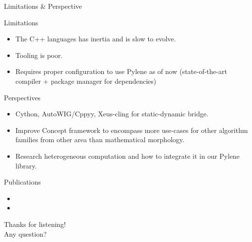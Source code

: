 \documentclass[12pt,aspectratio=169]{beamer}
\begin{document}
\begin{frame}{Limitations \& Perspective}
  \begin{alertblock}{Limitations}
    \begin{itemize}
      \item The C++ languages has inertia and is slow to evolve.
      \item Tooling is poor.
      \item Requires proper configuration to use Pylene as of now (state-of-the-art compiler + package manager for
            dependencies)
    \end{itemize}
  \end{alertblock}
  \begin{alertblock}{Perspectives}
    \begin{itemize}
      \item Cython, AutoWIG/Cppyy, Xeus-cling for static-dynamic bridge.
      \item Improve Concept framework to encompass more use-cases for other algorithm families from other area than
            mathematical morphology.
      \item Research heterogeneous computation and how to integrate it in our Pylene library.
    \end{itemize}
  \end{alertblock}
\end{frame}


\begin{frame}[allowframebreaks]{Publications}
  \footnotesize
  \begin{itemize}
    \item {}
    \item {}
  \end{itemize}
\end{frame}

{
\begin{frame}[standout]
  Thanks for listening!\\
  Any question?
\end{frame}
}

\maketitle
\end{document}
